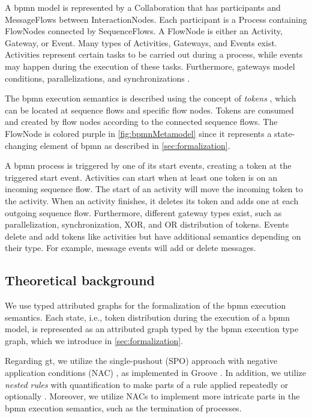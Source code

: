 \documentclass[runningheads]{llncs}
\begin{document}
A \gls*{bpmn} model is represented by a \textsf{Collaboration} that has \textsf{participants} and \textsf{MessageFlows} between \textsf{InteractionNodes}.
Each participant is a \textsf{Process} containing \textsf{FlowNodes} connected by \textsf{SequenceFlows}.
A \textsf{FlowNode} is either an \textsf{Activity}, \textsf{Gateway}, or \textsf{Event}.
Many types of \textsf{Activities}, \textsf{Gateways}, and \textsf{Events} exist.
Activities represent certain tasks to be carried out during a process, while events may happen during the execution of these tasks.
Furthermore, gateways model conditions, parallelizations, and synchronizations \cite{freundRealLifeBPMNUsing2019}.

The \gls*{bpmn} execution semantics is described using the concept of \textit{tokens} \cite{objectmanagementgroupBusinessProcessModel2013}, which can be located at sequence flows and specific flow nodes.
Tokens are consumed and created by flow nodes according to the connected sequence flows.
The \textsf{FlowNode} is colored purple in \autoref{fig:bpmnMetamodel} since it represents a state-changing element of \gls*{bpmn} as described in \autoref{sec:formalization}.

A \gls*{bpmn} process is triggered by one of its start events, creating a token at the triggered start event.
Activities can start when at least one token is on an incoming sequence flow.
The start of an activity will move the incoming token to the activity.
When an activity finishes, it deletes its token and adds one at each outgoing sequence flow.
Furthermore, different gateway types exist, such as parallelization, synchronization, XOR, and OR distribution of tokens.
Events delete and add tokens like activities but have additional semantics depending on their type.
For example, message events will add or delete messages.

\subsection{Theoretical background}
We use typed attributed graphs for the formalization of the \gls*{bpmn} execution semantics.
Each state, i.e., token distribution during the execution of a \gls*{bpmn} model, is represented as an attributed graph typed by the \gls*{bpmn} execution type graph, which we introduce in \autoref{sec:formalization}.

Regarding \gls*{gt}, we utilize the single-pushout (SPO) approach with negative application conditions (NAC) \cite{ehrigALGEBRAICAPPROACHESGRAPH1997}, as implemented in Groove \cite{rensinkGROOVESimulatorTool2004}.
In addition, we utilize \textit{nested rules} with quantification to make parts of a rule applied repeatedly or optionally \cite{rensinkNestedQuantificationGraph2006,rensinkHowMuchAre2017}.
Moreover, we utilize NACs to implement more intricate parts in the \gls*{bpmn} execution semantics, such as the termination of processes.
\end{document}
